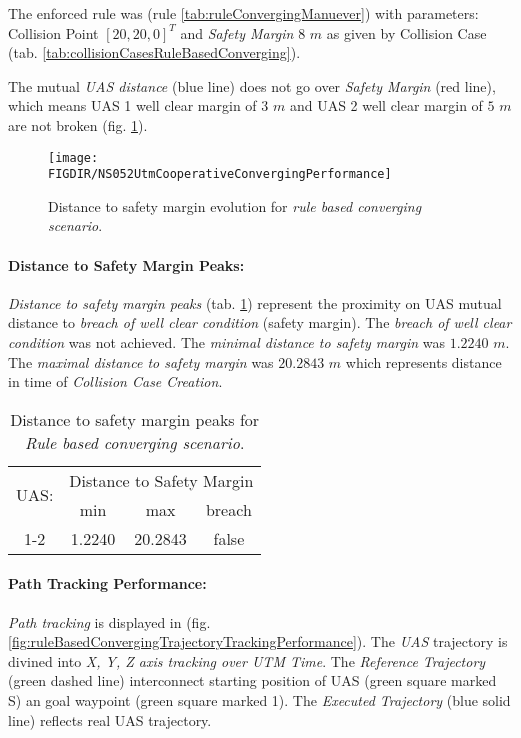 The enforced rule was (rule \ref{tab:ruleConvergingManuever}) with parameters: Collision Point $[20,20,0]^T$ and \emph{Safety Margin} $8$ $m$ as given by Collision Case (tab. \ref{tab:collisionCasesRuleBasedConverging}).

The mutual \emph{UAS distance} (blue line) does not go over \emph{Safety Margin} (red line), which means UAS 1 well clear margin of $3$ $m$ and UAS 2 well clear margin of $5$ $m$ are not broken (fig. \ref{fig:testCaseRuleBasedConvergingAvoidancePerformance}).

\begin{figure}[H]
    \centering
    \texttt{[image: \\FIGDIR/NS052UtmCooperativeConvergingPerformance]} 
    \caption{Distance to safety margin evolution for \emph{rule based converging scenario}.}
    \label{fig:testCaseRuleBasedConvergingAvoidancePerformance}
\end{figure}


\paragraph{Distance to Safety Margin Peaks:} \emph{Distance to safety margin peaks} (tab. \ref{tab:testCaseRuleBasedConvergingSafetyMarginDistances}) represent the proximity on UAS mutual distance to \emph{breach of well clear condition} (safety margin). The \emph{breach of well clear condition} was not achieved. The \emph{minimal distance to safety margin} was $1.2240$ $m$. The \emph{maximal distance to safety margin} was $20.2843$ $m$ which represents distance in time of \emph{Collision Case Creation}.

\begin{table}[H]
    \centering
    \begin{tabular}{c||c|c|c}
        \multirow{2}{*}{UAS:} & \multicolumn{3}{c}{Distance to Safety Margin} \\ \cline{2-4} 
                  & min          & max         & breach         \\ \hline\hline
            1-2   & 1.2240       & 20.2843     & false          \\ 
    \end{tabular}
    \caption{Distance to safety margin peaks for \emph{Rule based converging scenario}.}
    \label{tab:testCaseRuleBasedConvergingSafetyMarginDistances}
\end{table}

\paragraph{Path Tracking Performance:} \emph{Path tracking} is displayed in (fig. \ref{fig:ruleBasedConvergingTrajectoryTrackingPerformance}). The \emph{UAS} trajectory is divined into \emph{X, Y, Z axis tracking over UTM Time}. The \emph{Reference Trajectory} (green dashed line) interconnect starting position of UAS (green square marked S) an goal waypoint (green square marked 1). The \emph{Executed Trajectory} (blue solid line) reflects real UAS trajectory. 

